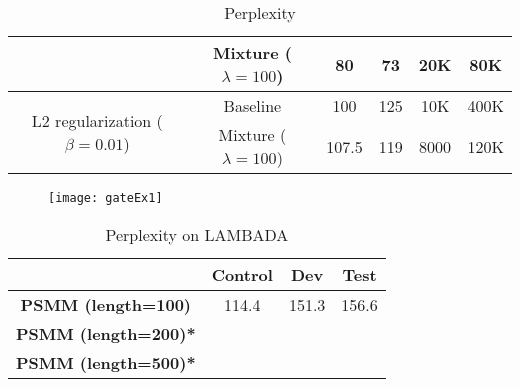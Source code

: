 \begin{table}[]
\begin{tabular}{cc|c|c|c|c|}
		\multicolumn{1}{|c|}{}                                                  & Mixture ($\lambda=100$) & 80          & 73         & 20K          & 80K         \\ \hline
		\multicolumn{1}{|c|}{\multirow{2}{*}{L2 regularization ($\beta=0.01$)}} & Baseline                & 100         & 125        & 10K          & 400K        \\ \cline{2-6} 
		\multicolumn{1}{|c|}{}                                                  & Mixture ($\lambda=100$) & 107.5       & 119        & 8000         & 120K        \\ \hline
	\end{tabular}
	\caption{Perplexity}
	\label{smmExps}
\end{table}

\begin{figure}[H]
	\centering
	\texttt{[image: gateEx1]}
	\label{fig:gateEx1}
\end{figure}


\begin{table}[]
	\centering
	\begin{tabular}{c|c|c|c|}
		\cline{2-4}
		\multicolumn{1}{l|}{}                             & \textbf{Control} & \textbf{Dev} & \textbf{Test} \\ \hline
		\multicolumn{1}{|c|}{\textbf{PSMM (length=100)}}  & 114.4            & 151.3        & 156.6         \\ \hline
		\multicolumn{1}{|c|}{\textbf{PSMM (length=200)*}} &                  &              &               \\ \hline
		\multicolumn{1}{|c|}{\textbf{PSMM (length=500)*}} &                  &              &               \\ \hline
	\end{tabular}
	\caption{Perplexity on LAMBADA}
	\label{psmmExps}
\end{table}